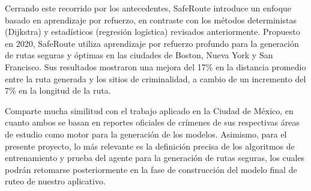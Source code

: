 
Cerrando este recorrido por los antecedentes, SafeRoute introduce un enfoque basado en aprendizaje por refuerzo, en contraste con los métodos deterministas (Dijkstra) y estadísticos (regresión logística) revisados anteriormente. Propuesto en 2020, SafeRoute utiliza aprendizaje por refuerzo profundo para la generación de rutas seguras y óptimas en las ciudades de Boston, Nueva York y San Francisco. Sus resultados mostraron una mejora del 17\% en la distancia promedio entre la ruta generada y los sitios de criminalidad, a cambio de un incremento del 7\% en la longitud de la ruta\cite{levy2020saferoute}.

Comparte mucha similitud con el trabajo aplicado en la Ciudad de México, en cuanto ambos se basan en reportes oficiales de crímenes de sus respectivas áreas de estudio como motor para la generación de los modelos. Asimismo, para el presente proyecto, lo más relevante es la definición precisa de los algoritmos de entrenamiento y prueba del agente para la generación de rutas seguras, los cuales podrán retomarse posteriormente en la fase de construcción del modelo final de ruteo de nuestro aplicativo.
